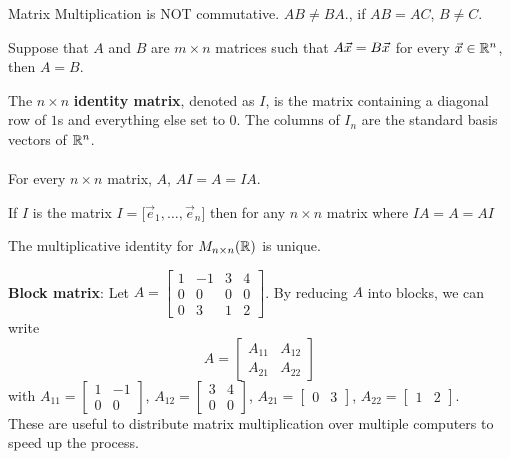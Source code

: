 \documentclass[english, 12pt]{article}
\begin{document}
\begin{qte}
Matrix Multiplication is NOT commutative. $AB \neq BA$., if $AB = AC$, $B \neq C$.
\end{qte}

\begin{thrm}
Suppose that $A$ and $B$ are $m \times n$ matrices such that $A\vec{x} = B\vec{x}$ for every $\vec{x} \in {\mathbb{R}}^n$, then $A=B$.
\end{thrm}

\begin{defn}
The $n \times n$ \textbf{identity matrix}, denoted as $I$, is the matrix containing a diagonal row of $1$s and everything else set to $0$. The columns of $I_{n}$ are the standard basis vectors of ${\mathbb{R}}^n$. \\\\
For every $n \times n$ matrix, $A$, $AI = A = IA$.
\end{defn}

\begin{thrm}
If $I$ is the matrix $I = \lbrack \vec{e}_1,\dots,\vec{e}_n \rbrack$ then for any $n \times n$ matrix where $IA = A = AI$
\end{thrm}

\begin{thrm}
The multiplicative identity for $M_{n\times n} ({\mathbb{R}})$ is unique.
\end{thrm}

\begin{exmp}
\textbf{Block matrix}: Let $A = \begin{bmatrix} 1 & -1 & 3 & 4 \\ 0 & 0 & 0 & 0 \\ 0 & 3 & 1 & 2 \end{bmatrix} $. By reducing $A$ into blocks, we can write
\[ A = \begin{bmatrix} A_{11} & A_{12} \\ A_{21} & A_{22} \end{bmatrix} \]
with $A_{11} = \begin{bmatrix} 1 & -1 \\ 0 & 0 \end{bmatrix}$, $A_{12} = \begin{bmatrix} 3 & 4 \\ 0 & 0 \end{bmatrix}$,
$A_{21} = \begin{bmatrix} 0 & 3 \end{bmatrix} $, $A_{22} = \begin{bmatrix} 1 & 2 \end{bmatrix}$. \\
These are useful to distribute matrix multiplication over multiple computers to speed up the process.
\end{exmp}
\end{document}
